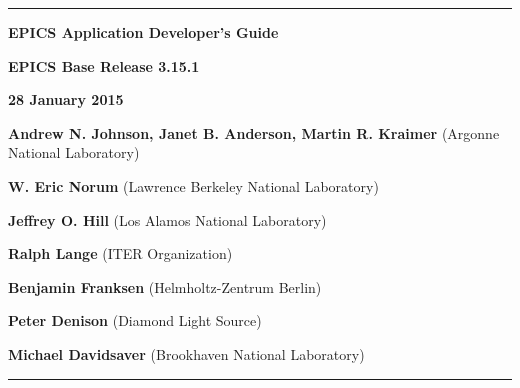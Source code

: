 \hrule

\vspace{1in}

\noindent \Huge \textbf{EPICS Application Developer's Guide}

\vspace{0.5in}

\noindent \Large \textbf{EPICS Base Release 3.15.1}

\noindent \textbf{28 January 2015}

\vspace{0.5in}

\normalsize
\noindent \textbf{Andrew N. Johnson, Janet B. Anderson, Martin R. Kraimer} (Argonne National Laboratory)

\noindent \textbf{W. Eric Norum} (Lawrence Berkeley National Laboratory)

\noindent \textbf{Jeffrey O. Hill} (Los Alamos National Laboratory)

\noindent \textbf{Ralph Lange} (ITER Organization)

\noindent \textbf{Benjamin Franksen} (Helmholtz-Zentrum Berlin)

\noindent \textbf{Peter Denison} (Diamond Light Source)

\noindent \textbf{Michael Davidsaver} (Brookhaven National Laboratory)

\vspace{1in}
\hrule
